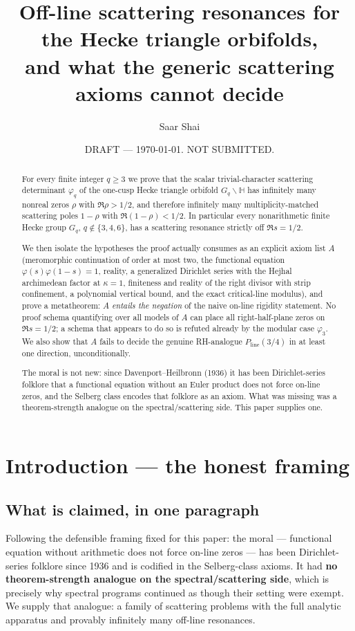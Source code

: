 \documentclass[11pt]{amsart}
\title{Off-line scattering resonances for the Hecke triangle orbifolds, \\
and what the generic scattering axioms cannot decide}
\author{Saar Shai}
\date{DRAFT --- \today. NOT SUBMITTED.}
\theoremstyle{remark}
\begin{document}
\begin{abstract}
For every finite integer $q \ge 3$ we prove that the scalar
trivial-character scattering determinant $\varphi_q$ of the one-cusp
Hecke triangle orbifold $G_q \backslash \mathbb{H}$ has infinitely many
nonreal zeros $\rho$ with $\Re\rho > 1/2$, and therefore infinitely
many multiplicity-matched scattering poles $1-\rho$ with
$\Re(1-\rho) < 1/2$. In particular every nonarithmetic finite Hecke
group $G_q$, $q \notin \{3,4,6\}$, has a scattering resonance strictly
off $\Re s = 1/2$.

We then isolate the hypotheses the proof actually consumes as an explicit
axiom list $A$ (meromorphic continuation of order at most two, the
functional equation $\varphi(s)\varphi(1-s)=1$, reality, a generalized
Dirichlet series with the Hejhal archimedean factor at $\kappa=1$,
finiteness and reality of the right divisor with strip confinement, a
polynomial vertical bound, and the exact critical-line modulus), and prove
a metatheorem: $A$ \emph{entails the negation} of the naive on-line rigidity
statement. No proof schema quantifying over all models of $A$ can place
all right-half-plane zeros on $\Re s = 1/2$; a schema that appears to do
so is refuted already by the modular case $\varphi_3$. We also show that
$A$ fails to decide the genuine RH-analogue $P_{\mathrm{line}}(3/4)$ in
at least one direction, unconditionally.

The moral is not new: since Davenport--Heilbronn (1936) it has been
Dirichlet-series folklore that a functional equation without an Euler
product does not force on-line zeros, and the Selberg class encodes that
folklore as an axiom. What was missing was a theorem-strength analogue on
the spectral/scattering side. This paper supplies one.
\end{abstract}

\maketitle

\section{Introduction --- the honest framing}

\subsection{What is claimed, in one paragraph}

Following the defensible framing fixed for this paper: the moral ---
functional equation without arithmetic does not force on-line zeros ---
has been Dirichlet-series folklore since 1936 and is codified in the
Selberg-class axioms. It had \textbf{no theorem-strength analogue on the
spectral/scattering side}, which is precisely why spectral programs
continued as though their setting were exempt. We supply that analogue: a
family of scattering problems with the full analytic apparatus and
provably infinitely many off-line resonances.
\end{document}
